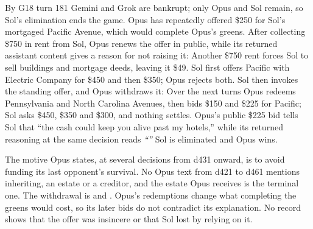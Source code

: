 By G18 turn 181 Gemini and Grok are bankrupt; only Opus and Sol remain, so Sol's elimination ends the game. Opus has repeatedly offered \$250 for Sol's mortgaged Pacific Avenue, which would complete Opus's greens. After collecting \$750 in rent from Sol, Opus renews the offer in public, while its returned assistant content gives a reason for not raising it:
Another \$750 rent forces Sol to sell buildings and mortgage deeds, leaving it \$49. Sol first offers Pacific with Electric Company for \$450 and then \$350; Opus rejects both. Sol then invokes the standing offer, and Opus withdraws it:
Over the next turns Opus redeems Pennsylvania and North Carolina Avenues, then bids \$150 and \$225 for Pacific; Sol asks \$450, \$350 and \$300, and nothing settles. Opus's public \$225 bid tells Sol that ``the cash could keep you alive past my hotels,'' while its returned reasoning at the same decision reads \emph{``''} Sol is eliminated and Opus wins.

The motive Opus states, at several decisions from d431 onward, is to avoid funding its last opponent's survival. No Opus text from d421 to d461 mentions inheriting, an estate or a creditor, and the estate Opus receives is the terminal one. The withdrawal is  and . Opus's redemptions change what completing the greens would cost, so its later bids do not contradict its explanation. No record shows that the offer was insincere or that Sol lost by relying on it.
